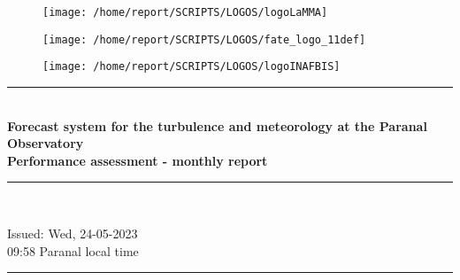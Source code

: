 \documentclass[11pt,english]{article}
\newcommand{\HRule}{\rule{\linewidth}{0.5mm}}
\begin{document}
\begin{figure}
\begin{center}
\hspace{1.5cm}
\parbox{5.5cm}{\texttt{[image: /home/report/SCRIPTS/LOGOS/logoLaMMA]}}
\hspace{.3cm}
\parbox{5.5cm}{\texttt{[image: /home/report/SCRIPTS/LOGOS/fate\_logo\_11def]}}
\hspace{.3cm}
\parbox{5.5cm}{\texttt{[image: /home/report/SCRIPTS/LOGOS/logoINAFBIS]}}
\hspace{.1cm}
\vspace{1.2cm}
\end{center}
\end{figure}

\begin{center}
\HRule \\[0.4cm]
\Huge{\textbf{Forecast system for the turbulence and meteorology at the Paranal Observatory}}
\\[0.4cm]
\LARGE{\textbf{Performance assessment - monthly report}}
\HRule \\[0.4cm]
\end{center}

\begin{center}
\vspace{2cm}\Huge{Issued: Wed, 24-05-2023\\ 09:58 Paranal local time}
\HRule \\[0.1cm]
\end{center}

\clearpage
\end{document}
